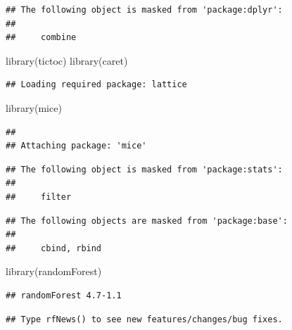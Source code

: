 \documentclass[
]{article}
\newenvironment{Shaded}{\begin{snugshade}}{\end{snugshade}}
\newcommand{\FunctionTok}[1]{\textcolor[rgb]{0.00,0.00,0.00}{#1}}
\newcommand{\NormalTok}[1]{#1}
\newcommand{\StringTok}[1]{\textcolor[rgb]{0.31,0.60,0.02}{#1}}
\begin{document}
\begin{verbatim}
## The following object is masked from 'package:dplyr':
## 
##     combine
\end{verbatim}

\begin{Shaded}
\begin{Highlighting}[]
\FunctionTok{library}\NormalTok{(}\StringTok{\textquotesingle{}tictoc\textquotesingle{}}\NormalTok{) }
\FunctionTok{library}\NormalTok{(}\StringTok{\textquotesingle{}caret\textquotesingle{}}\NormalTok{) }
\end{Highlighting}
\end{Shaded}

\begin{verbatim}
## Loading required package: lattice
\end{verbatim}

\begin{Shaded}
\begin{Highlighting}[]
\FunctionTok{library}\NormalTok{(}\StringTok{\textquotesingle{}mice\textquotesingle{}}\NormalTok{)}
\end{Highlighting}
\end{Shaded}

\begin{verbatim}
## 
## Attaching package: 'mice'
\end{verbatim}

\begin{verbatim}
## The following object is masked from 'package:stats':
## 
##     filter
\end{verbatim}

\begin{verbatim}
## The following objects are masked from 'package:base':
## 
##     cbind, rbind
\end{verbatim}

\begin{Shaded}
\begin{Highlighting}[]
\FunctionTok{library}\NormalTok{(}\StringTok{\textquotesingle{}randomForest\textquotesingle{}}\NormalTok{)}
\end{Highlighting}
\end{Shaded}

\begin{verbatim}
## randomForest 4.7-1.1
\end{verbatim}

\begin{verbatim}
## Type rfNews() to see new features/changes/bug fixes.
\end{verbatim}
\end{document}
